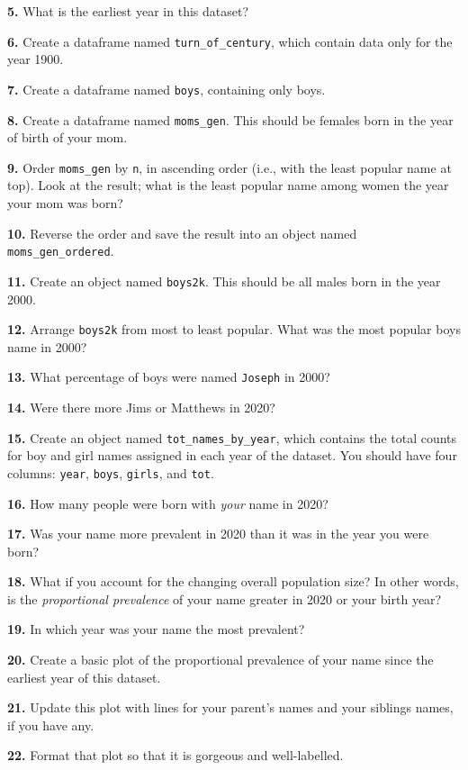 \documentclass[
]{book}
\begin{document}
\textbf{5.} What is the earliest year in this dataset?

\textbf{6.} Create a dataframe named \texttt{turn\_of\_century}, which contain data only for the year 1900.

\textbf{7.} Create a dataframe named \texttt{boys}, containing only boys.

\textbf{8.} Create a dataframe named \texttt{moms\_gen}. This should be females born in the year of birth of your mom.

\textbf{9.} Order \texttt{moms\_gen} by \texttt{n}, in ascending order (i.e., with the least popular name at top). Look at the result; what is the least popular name among women the year your mom was born?

\textbf{10.} Reverse the order and save the result into an object named \texttt{moms\_gen\_ordered}.

\textbf{11.} Create an object named \texttt{boys2k}. This should be all males born in the year 2000.

\textbf{12.} Arrange \texttt{boys2k} from most to least popular. What was the most popular boys name in 2000?

\textbf{13.} What percentage of boys were named \texttt{Joseph} in 2000?

\textbf{14.} Were there more Jims or Matthews in 2020?

\textbf{15.} Create an object named \texttt{tot\_names\_by\_year}, which contains the total counts for boy and girl names assigned in each year of the dataset. You should have four columns: \texttt{year}, \texttt{boys}, \texttt{girls}, and \texttt{tot}.

\textbf{16.} How many people were born with \emph{your} name in 2020?

\textbf{17.} Was your name more prevalent in 2020 than it was in the year you were born?

\textbf{18.} What if you account for the changing overall population size? In other words, is the \emph{proportional prevalence} of your name greater in 2020 or your birth year?

\textbf{19.} In which year was your name the most prevalent?

\textbf{20.} Create a basic plot of the proportional prevalence of your name since the earliest year of this dataset.

\textbf{21.} Update this plot with lines for your parent's names and your siblings names, if you have any.

\textbf{22.} Format that plot so that it is gorgeous and well-labelled.
\end{document}

